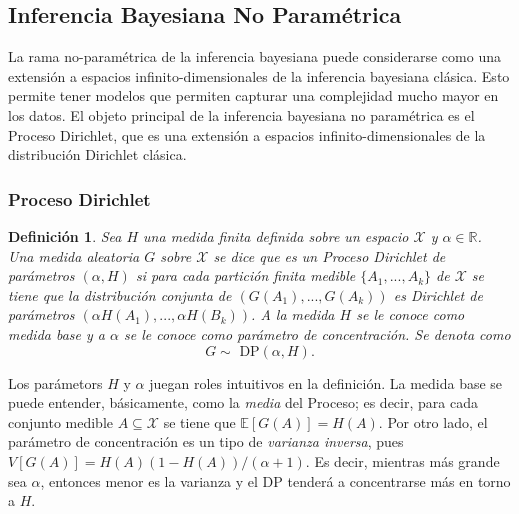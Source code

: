 \documentclass[11pt]{article}
\theoremstyle{plain}
\newtheorem{defi}[teo]{Definición}
\begin{document}
\subsection{Inferencia Bayesiana No Paramétrica}
La rama no-paramétrica de la inferencia bayesiana puede considerarse como una extensión a espacios infinito-dimensionales de la inferencia bayesiana clásica. Esto permite tener modelos que permiten capturar una complejidad mucho mayor en los datos. El objeto principal de la inferencia bayesiana no paramétrica es el Proceso Dirichlet, que es una extensión a espacios infinito-dimensionales de la distribución Dirichlet clásica.
\subsubsection{Proceso Dirichlet}
\begin{defi}
Sea $H$ una medida finita definida sobre un espacio $\mathcal{X}$ y $\alpha \in \mathbb{R}$. Una medida aleatoria $G$ sobre $\mathcal{X}$ se dice que es un Proceso Dirichlet de parámetros $(\alpha,H)$ si para cada partición finita medible $\{ A_1 , ..., A_k \}$ de $\mathcal{X}$ se tiene que la distribución conjunta de $(G(A_1),...,G(A_k))$ es Dirichlet de parámetros $(\alpha H(A_1),...,\alpha H(B_k))$. A la medida $H$ se le conoce como medida base y a $\alpha$ se le conoce como parámetro de concentración. Se denota como
\[ G \sim \textrm{ DP}(\alpha,H).\]
\end{defi}
Los parámetors $H$ y $\alpha$ juegan roles intuitivos en la definición. La medida base se puede entender, básicamente, como la \textit{media} del Proceso; es decir, para cada conjunto medible $A \subseteq \mathcal{X}$ se tiene que $\mathbb{E}[G(A)]=H(A)$. Por otro lado, el parámetro de concentración es un tipo de \textit{varianza inversa}, pues $V[G(A)]=H(A)(1-H(A))/(\alpha+1)$. Es decir, mientras más grande sea $\alpha$, entonces menor es la varianza y el DP tenderá a concentrarse más en torno a $H$.\\
\end{document}
